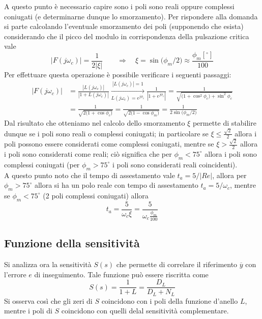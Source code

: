 		A questo punto è necessario capire sono i poli sono reali oppure complessi coniugati (e determinarne dunque lo smorzamento). Per rispondere alla domanda si parte calcolando l'eventuale smorzamento dei poli (supponendo che esista) considerando che il picco del modulo in corrispondenza della pulsazione critica vale
		\[ |F(j\omega_c)| = \frac{1}{2|\xi|} \qquad \Rightarrow \quad \xi = \sin\big(\phi_m/2\big) \approx \frac{\phi_m[^\circ]}{100} \]
		Per effettuare questa operazione è possibile verificare i seguenti passaggi:
		\begin{align*}
			|F(j\omega_c)| & = \frac{|L(j\omega_c)|}{|1+L(j\omega_c)|} \xrightarrow[L(j\omega_c) = e^{j\phi_c}]{|L(j\omega_c)| =1 } \frac{1}{|1 + e^{j\phi_c}|} = \frac 1  {\sqrt{\big(1 + \cos^2\phi_c\big) + \sin^2\phi_c}} \\
			& = \frac 1 {\sqrt{2\big(1+ \cos\phi_c\big)}} = \frac{1}{\sqrt{2 \big(1-\cos \phi_m\big)}} = \frac 1 {2\sin\big(\phi_m/2\big)}
		\end{align*}
		Dal risultato che otteniamo nel calcolo dello smorzamento $\xi$ permette di stabilire dunque se i poli sono reali o complessi coniugati; in particolare se $\xi\leq \frac {\sqrt 2 } 2$ allora i poli possono essere considerati come complessi coniugati, mentre se $\xi > \frac {\sqrt 2} 2$ allora i poli sono considerati come reali; ciò significa che per $\phi_m < 75^\circ$ allora i poli sono complessi coniugati (per $\phi_m > 75^\circ$ i poli sono considerati reali coincidenti). \\
		A questo punto noto che il tempo di assestamento vale $t_a = 5 / |Re|$, allora per $\phi_m > 75^\circ$ allora si ha un polo reale con tempo di assestamento $t_a = 5 /\omega_c$, mentre se $\phi_m < 75^\circ$ (2 poli complessi coniugati) allora
		\[ t_a = \frac{5}{\omega_c \xi} = \frac{5}{\omega_c \frac{\phi_m}{100}} \]
		
	\subsection{Funzione della sensitività}
		
		Si analizza ora la sensitività $S(s)$ che permette di correlare il riferimento $\overline y$ con l'errore $e$ di inseguimento. Tale funzione può essere riscritta come
		\[ S(s) = \frac 1 {1+L}  = \frac{D_L}{D_L+N_L} \]
		Si osserva così che gli zeri di $S$ coincidono con i poli della funzione d'anello $L$, mentre i poli di $S$ coincidono con quelli delal sensitività complementare.
		
